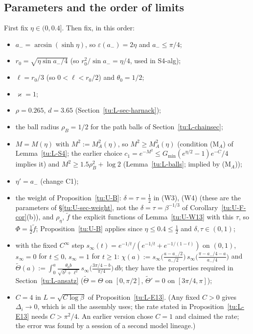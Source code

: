 \subsection{Parameters and the order of limits}
First fix $\eta\in(0,0.4]$. Then fix, in this order:
\begin{itemize}
\item $a_-=\arcsin(\sinh\eta)$, so $\varepsilon(a_-)=2\eta$ and $a_-\le\pi/4$;
\item $r_0=\sqrt{\eta\sin a_-/4}$ (so $r_0^2/\sin a_-=\eta/4$, used in S4-alg);
\item $\ell=r_0/3$ (so $0<\ell<r_0/2$) and $\theta_0=1/2$;
\item $\varkappa=1$;
\item $\rho=0.265$, $d=3.65$ (Section~\ref{tu:L-sec-harnack});
\item the ball radius $\rho_B=1/2$ for the path balls of Section~\ref{tu:L-chainsec};
\item $M=M(\eta)$ with $M^2:=M_A^2(\eta)$, so $M^2\ge M_A^2(\eta)$ (condition (M$_A$) of Lemma~\ref{tu:L-S4}; the earlier choice $c_1=e^{-M^2}\le G_{\min}(e^{\eta/2}-1)e^{-C}/4$ implies it) and $M^2\ge1.5\rho_B^2+\log2$ (Lemma~\ref{tu:L-balls}; implied by (M$_A$));
\item $\eta'=a_-$ (change C1);
\item the weight of Proposition~\ref{tu:U-B}: $\delta=\tau=\frac12$ in (W3), (W4) (these are the parameters of
\S\ref{tu:U-sec-weight}, not the $\delta=\tau=\beta^{-1/3}$ of Corollary~\ref{tu:U-F-cor}(b)), and $\rho_\eta$, $\tilde f$ the explicit
functions of Lemma~\ref{tu:U-W13} with this $\tau$, so $\Phi=\frac12\tilde f$; Proposition~\ref{tu:U-B} applies since
$\eta\le0.4\le\frac12$ and $\delta,\tau\in(0,1)$;
\item with the fixed $C^\infty$ step $s_\infty(t)=e^{-1/t}/(e^{-1/t}+e^{-1/(1-t)})$ on $(0,1)$, $s_\infty=0$ for $t\le0$,
$s_\infty=1$ for $t\ge1$:
$\chi(a):=s_\infty\big(\frac{a-a_-/2}{a_-/2}\big)\,s_\infty\big(\frac{\pi-a_-/4-a}{a_-/4}\big)$ and
$\tilde\Theta(a):=\int_0^a\frac{\theta_0b}{\sqrt{b^2+\ell^2}}\,s_\infty\big(\frac{3\pi/4-b}{\pi/4}\big)\,db$; they have the properties
required in Section~\ref{tu:L-ansatz} ($\tilde\Theta=\Theta$ on $[0,\pi/2]$, $\tilde\Theta'=0$ on $[3\pi/4,\pi]$);
\item $C=4$ in $L=\sqrt{C\log\beta}$ of Proposition~\ref{tu:L-E13}. (Any fixed $C>0$ gives $\Delta_i\to0$, which is all the assembly uses; the rate stated in Proposition~\ref{tu:L-E13} needs $C>\pi^2/4$. An earlier version chose $C=1$ and claimed the rate; the error was found by a session of a second model lineage.)
\end{itemize}
